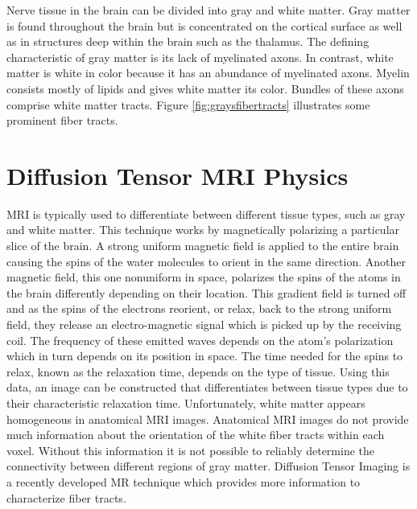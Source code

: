 Nerve tissue in the brain can be divided into gray and white matter.  Gray matter is found throughout the brain but is concentrated on the cortical surface as well as in structures deep within the brain such as the thalamus.  The defining characteristic of gray matter is its lack of myelinated axons.  In contrast, white matter is white in color because it has an abundance of myelinated axons.  Myelin consists mostly of lipids and gives white matter its color.  Bundles of these axons comprise white matter tracts. Figure \ref{fig:graysfibertracts} illustrates some prominent fiber tracts.

\section{Diffusion Tensor MRI Physics}

MRI is typically used to differentiate between different tissue types, such as gray and white matter.  This technique works by magnetically polarizing a particular slice of the brain.  A strong uniform magnetic field is applied to the entire brain causing the spins of the water molecules to orient in the same direction.  Another magnetic field, this one nonuniform in space, polarizes the spins of the atoms in the brain differently depending on their location.  This gradient field is turned off and as the spins of the electrons reorient, or relax, back to the strong uniform field, they release an electro-magnetic signal which is picked up by the receiving coil.  The frequency of these emitted waves depends on the atom's polarization which in turn depends on its position in space.  The time needed for the spins to relax, known as the relaxation time, depends on the type of tissue.  Using this data, an image can be constructed that differentiates between tissue types due to their characteristic relaxation time. Unfortunately, white matter appears homogeneous in anatomical MRI images.  Anatomical MRI images do not provide much information about the orientation of the white fiber tracts within each voxel.  Without this information it is not possible to reliably determine the connectivity between different regions of gray matter.  Diffusion Tensor Imaging is a recently developed MR technique which provides more information to characterize fiber tracts.

